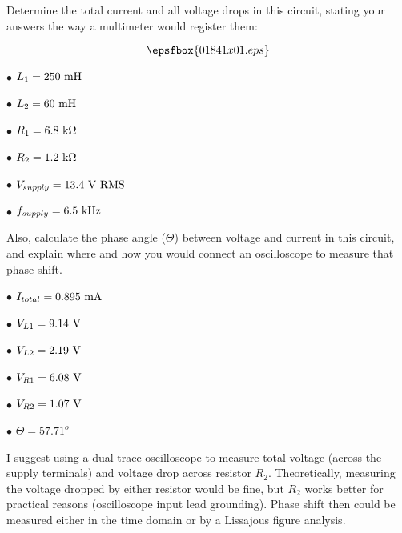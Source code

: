 

Determine the total current and all voltage drops in this circuit, stating your answers the way a multimeter would register them:

$$\epsfbox{01841x01.eps}$$

\goodbreak

\item{$\bullet$} $L_1 = 250 \hbox{ mH}$
\item{$\bullet$} $L_2 = 60 \hbox{ mH}$
\item{$\bullet$} $R_1 = 6.8 \hbox{ k}\Omega$
\item{$\bullet$} $R_2 = 1.2 \hbox{ k}\Omega$
\item{$\bullet$} $V_{supply} = 13.4 \hbox{ V RMS}$
\item{$\bullet$} $f_{supply} = 6.5 \hbox{ kHz}$

\vskip 10pt

Also, calculate the phase angle ($\Theta$) between voltage and current in this circuit, and explain where and how you would connect an oscilloscope to measure that phase shift.







\item{$\bullet$} $I_{total} = 0.895 \hbox{ mA}$
\item{$\bullet$} $V_{L1} = 9.14 \hbox{ V}$
\item{$\bullet$} $V_{L2} = 2.19 \hbox{ V}$
\item{$\bullet$} $V_{R1} = 6.08 \hbox{ V}$
\item{$\bullet$} $V_{R2} = 1.07 \hbox{ V}$
\item{$\bullet$} $\Theta = 57.71^o$
\medskip

I suggest using a dual-trace oscilloscope to measure total voltage (across the supply terminals) and voltage drop across resistor $R_2$.  Theoretically, measuring the voltage dropped by either resistor would be fine, but $R_2$ works better for practical reasons (oscilloscope input lead grounding).  Phase shift then could be measured either in the time domain or by a Lissajous figure analysis.






